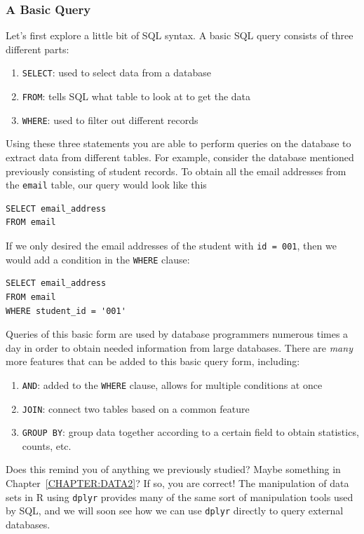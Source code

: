 \documentclass[12pt,oneside]{book}\usepackage[]{graphicx}\usepackage[]{color}
\newcommand{\be}{\begin{enumerate}}
\newcommand{\ee}{\end{enumerate}}
\begin{document}
{{{{\subsubsection{A Basic Query}

Let's first explore a little bit of SQL syntax. A basic SQL query consists of three different parts: 

\be
\item \verb+SELECT+: used to select data from a database
\item \verb+FROM+: tells SQL what table to look at to get the data
\item \verb+WHERE+: used to filter out different records
\ee

Using these three statements you are able to perform queries on the database to extract data from different tables. For example, consider the database mentioned previously consisting of student records. To obtain all the email addresses from the \verb+email+ table, our query would look like this 

\begin{verbatim}
SELECT email_address
FROM email
\end{verbatim}

If we only desired the email addresses of the student with \verb+id = 001+, then we would add a condition in the \verb+WHERE+ clause:

\begin{verbatim}
SELECT email_address
FROM email
WHERE student_id = '001'
\end{verbatim}

Queries of this basic form are used by database programmers numerous times a day in order to obtain needed information from large databases. There are \emph{many} more features that can be added to this basic query form, including: 

\be
\item \verb+AND+: added to the \verb+WHERE+ clause, allows for multiple conditions at once
\item \verb+JOIN+: connect two tables based on a common feature
\item \verb+GROUP BY+: group data together according to a certain field to obtain statistics, counts, etc.
\ee

Does this remind you of anything we previously studied? Maybe something in Chapter~\ref{CHAPTER:DATA2}? If so, you are correct! The manipulation of data sets in R using \verb+dplyr+ provides many of the same sort of manipulation tools used by SQL, and we will soon see how we can use \verb+dplyr+ directly to query external databases. 

}}}}
\end{document}
